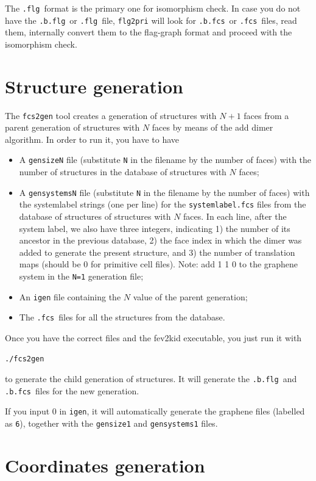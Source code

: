 \documentclass{scrreprt}
\newcommand{\fcs}{\texttt{.fcs}}
\newcommand{\flg}{\texttt{.flg}}
\newcommand{\fcsb}{\texttt{.b.fcs}}
\newcommand{\flgb}{\texttt{.b.flg}}
\begin{document}
The \flg~format is the primary one for isomorphism check. In case you do not have the \flgb~or \flg~file, \verb-flg2pri- will look for \fcsb~or \fcs~files, read them, internally convert them to the flag-graph format and proceed with the isomorphism check. 

\section{Structure generation}

The \verb-fcs2gen- tool creates a generation of structures with $N+1$ faces from a parent generation of structures with $N$ faces by means of the add dimer algorithm. In order to run it, you have to have 
\begin{itemize}
 \item A \verb-gensizeN- file (substitute \verb-N- in the filename by the number of faces) with the number of structures in the database of structures with $N$ faces;
 \item A \verb-gensystemsN- file (substitute \verb-N- in the filename by the number of faces) with the systemlabel strings (one per line) for the \verb-systemlabel.fcs- files from the database of structures of structures with $N$ faces. In each line, after the system label, we also have three integers, indicating 1) the number of its ancestor in the previous database, 2) the face index in which the dimer was added to generate the present structure, and 3) the number of translation maps (should be 0 for primitive cell files). Note: add 1 1 0 to the graphene system in the \verb-N=1- generation file;
 \item An \verb-igen- file containing the $N$ value of the parent generation;
 \item The \fcs~files for all the structures from the database.
\end{itemize}
Once you have the correct files and the fev2kid executable, you just run it with
\begin{verbatim}
./fcs2gen 
\end{verbatim}
to generate the child generation of structures. It will generate the \flgb~and \fcsb~files for the new generation.

If you input 0 in \verb-igen-, it will automatically generate the graphene files (labelled as \verb-6-), together with the \verb-gensize1- and \verb-gensystems1- files.

\section{Coordinates generation}
\end{document}
